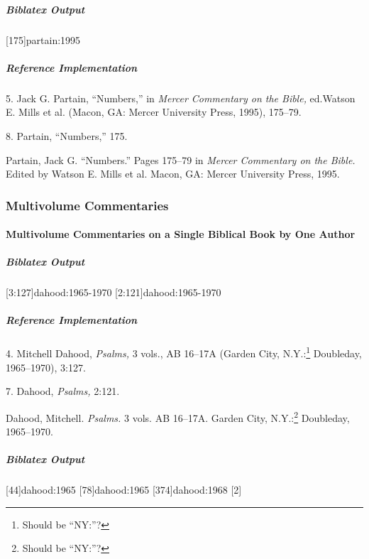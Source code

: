 \documentclass[a4paper]{article}
\newenvironment{biboutput}{%
  \subparagraph{Biblatex Output}
}{\color{black}}
\newenvironment{refimp}{%
  \subparagraph{Reference Implementation}
  \color{reference-colour}
  \rm
}{\par\color{black}}
\begin{document}
\begin{biboutput}
  [175]{partain:1995}
\end{biboutput}

\begin{refimp}
  \hspace*{\bibindent}5. Jack G. Partain, “Numbers,” in \emph{Mercer
  Commentary on the Bible,} ed.\@ Watson E. Mills et al. (Macon, GA: Mercer
  University Press, 1995), 175–79.

  \hspace*{\bibindent}8. Partain, “Numbers,” 175.

  \hangindent\bibindent Partain, Jack G. “Numbers.” Pages 175–79 in
  \emph{Mercer Commentary on the Bible.} Edited by Watson E. Mills et al.
  Macon, GA: Mercer University Press, 1995.
\end{refimp}

\subsubsection{Multivolume Commentaries}

\paragraph{Multivolume Commentaries on a Single Biblical Book by One Author}

\begin{biboutput}
  [3:127]{dahood:1965-1970}
  [2:121]{dahood:1965-1970}
\end{biboutput}

\begin{refimp}
  \hspace*{\bibindent}4. Mitchell Dahood, \emph{Psalms,} 3 vols., AB 16–17A
  (Garden City, N.Y.:\footnote{Should be “NY:”?} Doubleday, 1965–1970), 3:127.

  \hspace*{\bibindent}7. Dahood, \emph{Psalms,} 2:121.

  \hangindent\bibindent Dahood, Mitchell. \emph{Psalms.} 3 vols. AB 16–17A.
  Garden City, N.Y.:\footnote{Should be “NY:”?} Doubleday, 1965–1970.

\end{refimp}

\begin{biboutput}
  [44]{dahood:1965}
  [78]{dahood:1965}
  [374]{dahood:1968}
  [2]{%
    }
\end{biboutput}
\end{document}
